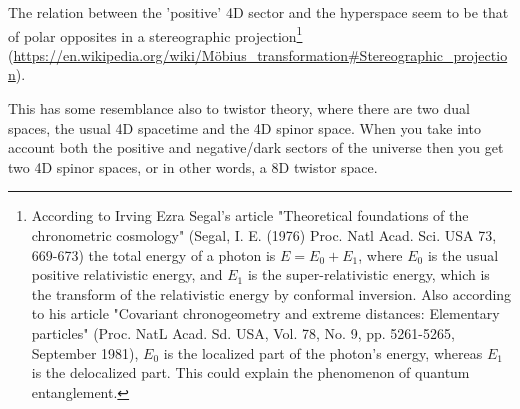 The relation between the 'positive' 4D sector and the hyperspace seem to be that of polar opposites in a stereographic projection\footnote{According to Irving Ezra Segal's article "Theoretical foundations of the chronometric cosmology" (Segal, I. E. (1976) Proc. Natl Acad. Sci. USA 73, 669-673) the total energy of a photon is $E=E_0+E_1$, where $E_0$ is the usual positive relativistic energy, and $E_1$ is the super-relativistic energy, which is the transform of the relativistic energy by conformal inversion. Also according to his article "Covariant chronogeometry and extreme distances: Elementary particles" (Proc. NatL Acad. Sd. USA, Vol. 78, No. 9, pp. 5261-5265, September 1981), $E_0$ is the localized part of the photon's energy, whereas $E_1$ is the delocalized part. This could explain the phenomenon of quantum entanglement.} \\
(\href{https://en.wikipedia.org/wiki/M%C3%B6bius_transformation#Stereographic_projection}{https://en.wikipedia.org/wiki/M\"{o}bius\_transformation\#Stereographic\_projection}).

This has some resemblance also to twistor theory, where there are two dual spaces, the usual 4D spacetime and the 4D spinor space. When you take into account both the positive and negative/dark sectors of the universe then you get two 4D spinor spaces, or in other words, a 8D twistor space.

